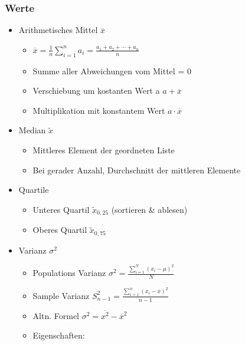 \documentclass[a4paper]{article}
\begin{document}
\begin{landscape}
\begin{multicols}{4}
    \subsubsection*{Werte}
    \begin{itemize}[noitemsep,nolistsep,leftmargin=*]
        \item Arithmetisches Mittel $\overline{x}$
        \begin{itemize}[noitemsep,nolistsep,leftmargin=*]
            \item $\overline{x}=\frac{1}{n}\sum _{i=1}^{n}a_{i}={\frac {a_{1}+a_{2}+\cdots +a_{n}}{n}}$ 
            \item Summe aller Abweichungen vom Mittel = 0
            \item Verschiebung um kostanten Wert a $a + \overline{x}$
            \item Multiplikation mit konstantem Wert $a \cdot \overline{x}$
        \end{itemize}
        \item Median $\widetilde{x}$
        \begin{itemize}[noitemsep,nolistsep,leftmargin=*]
            \item Mittleres Element der geordneten Liste
            \item Bei gerader Anzahl, Durchschnitt der mittleren Elemente
        \end{itemize}
        \item Quartile
        \begin{itemize}[noitemsep,nolistsep,leftmargin=*]
            \item Unteres Quartil $\widetilde{x}_{0,25}$ (sortieren \& ablesen)
            \item Oberes Quartil $\widetilde{x}_{0,75}$
        \end{itemize}
        \item Varianz $\sigma^2$
        \begin{itemize}[noitemsep,nolistsep,leftmargin=*]
            \item Populations Varianz $\sigma^2 = \frac{\displaystyle\sum_{i=1}^{N}(x_i - \mu)^2} {N}$
            \item Sample Varianz $S^2_{n-1} = \frac{\displaystyle\sum_{i=1}^{n}(x_i - \overline{x})^2} {n-1}$
            \item Altn. Formel $\sigma^2 = \overline{x^2} - \overline{x}^2$
            \item Eigenschaften:
                \begin{itemize}[noitemsep,nolistsep,leftmargin=*]

\end{itemize}
\end{itemize}
\end{itemize}
\end{multicols}
\end{landscape}
\end{document}
